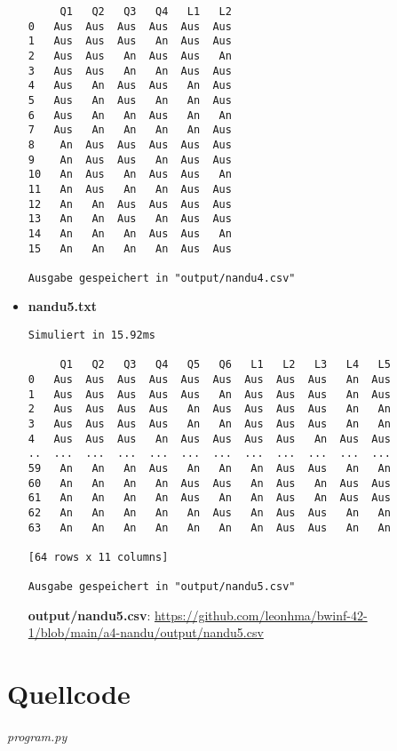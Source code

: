 \documentclass[a4paper,12pt]{scrartcl}
\theoremstyle{definition}
\begin{document}
\begin{itemize}
\begin{verbatim}
     Q1   Q2   Q3   Q4   L1   L2
0   Aus  Aus  Aus  Aus  Aus  Aus
1   Aus  Aus  Aus   An  Aus  Aus
2   Aus  Aus   An  Aus  Aus   An
3   Aus  Aus   An   An  Aus  Aus
4   Aus   An  Aus  Aus   An  Aus
5   Aus   An  Aus   An   An  Aus
6   Aus   An   An  Aus   An   An
7   Aus   An   An   An   An  Aus
8    An  Aus  Aus  Aus  Aus  Aus
9    An  Aus  Aus   An  Aus  Aus
10   An  Aus   An  Aus  Aus   An
11   An  Aus   An   An  Aus  Aus
12   An   An  Aus  Aus  Aus  Aus
13   An   An  Aus   An  Aus  Aus
14   An   An   An  Aus  Aus   An
15   An   An   An   An  Aus  Aus

Ausgabe gespeichert in "output/nandu4.csv"
	\end{verbatim}
	      \newpage
	\item \textbf{nandu5.txt}\begin{verbatim}
Simuliert in 15.92ms

     Q1   Q2   Q3   Q4   Q5   Q6   L1   L2   L3   L4   L5
0   Aus  Aus  Aus  Aus  Aus  Aus  Aus  Aus  Aus   An  Aus
1   Aus  Aus  Aus  Aus  Aus   An  Aus  Aus  Aus   An  Aus
2   Aus  Aus  Aus  Aus   An  Aus  Aus  Aus  Aus   An   An
3   Aus  Aus  Aus  Aus   An   An  Aus  Aus  Aus   An   An
4   Aus  Aus  Aus   An  Aus  Aus  Aus  Aus   An  Aus  Aus
..  ...  ...  ...  ...  ...  ...  ...  ...  ...  ...  ...
59   An   An   An  Aus   An   An   An  Aus  Aus   An   An
60   An   An   An   An  Aus  Aus   An  Aus   An  Aus  Aus
61   An   An   An   An  Aus   An   An  Aus   An  Aus  Aus
62   An   An   An   An   An  Aus   An  Aus  Aus   An   An
63   An   An   An   An   An   An   An  Aus  Aus   An   An

[64 rows x 11 columns]

Ausgabe gespeichert in "output/nandu5.csv"
			\end{verbatim}
	      \textbf{output/nandu5.csv}: \url{https://github.com/leonhma/bwinf-42-1/blob/main/a4-nandu/output/nandu5.csv}
\end{itemize}

\section{Quellcode}

\textit{program.py}
\inputminted[breaklines,linenos,fontsize=\footnotesize]{python3}{program.py}
\newpage
\end{document}
